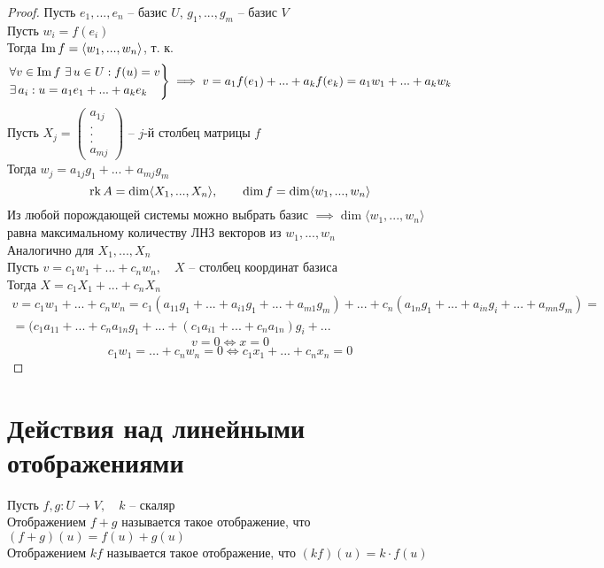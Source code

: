 \begin{proof}
	Пусть $ e_1, ..., e_n $ -- базис $ U $, $ g_1, ..., g_m $ -- базис $ V $ \\
    Пусть $ w_i = f(e_i) $ \\
    Тогда $ \operatorname{Im} f = \langle w_1, ..., w_n \rangle $, т. к.
    $$
    \begin{rcases}
    	\forall v \in \operatorname{Im} f ~ \exists\, u \in U : f(u) = v \\
        \exists\, a_i : u = a_1e_1 + ... + a_ke_k
    \end{rcases} \implies v = a_1f(e_1) + ... + a_kf(e_k) = a_1w_1 + ... + a_kw_k $$
    Пусть $ X_j =
    \begin{pmatrix}
        a_{1j} \\
        . \\
        . \\
        . \\
        a_{mj}
    \end{pmatrix} $ -- $j$-й столбец матрицы $ f $ \\
    Тогда $ w_j = a_{1j}g_1 + ... + a_{mj}g_m $
    $$ \operatorname{rk} A = \dim \langle X_1, ..., X_n \rangle, \qquad \dim f = \dim \langle w_1, ..., w_n \rangle $$
    Из любой порождающей системы можно выбрать базис $ \implies \dim \langle w_1, ..., w_n \rangle $ равна максимальному количеству ЛНЗ векторов из $ w_1, ..., w_n $ \\
    Аналогично для $ X_1, ..., X_n $ \\
    Пусть $ v = c_1w_1 + ... + c_nw_n, \quad X $ -- столбец координат базиса \\
    Тогда $ X = c_1X_1 + ... + c_nX_n $
    \begin{multline*}
        v = c_1w_1 + ... + c_nw_n = c_1(a_{11}g_1 + ... + a_{i1}g_1 + ... + a_{m1}g_m) + ... + c_n(a_{1n}g_1 + ... + a_{in}g_i + ... + a_{mn}g_m) = \\ = (c_1a_{11} + ... + c_na_{1n}g_1 + ... + (c_1a_{i1} + ... + c_na_{1n})g_i + ...
    \end{multline*}
    $$ v = 0 \iff x = 0 $$
    $$ c_1w_1 = ... + c_nw_n = 0 \iff c_1x_1 + ... + c_nx_n = 0 $$
\end{proof}

\section{Действия над линейными отображениями}

\begin{definition}
	Пусть $ f, g : U \to V, \quad k $ -- скаляр \\
    Отображением $ f + g $ называется такое отображение, что $ (f + g)(u) = f(u) + g(u) $ \\
    Отображением $ kf $ называется такое отображение, что $ (kf)(u) = k \cdot f(u) $
\end{definition}

